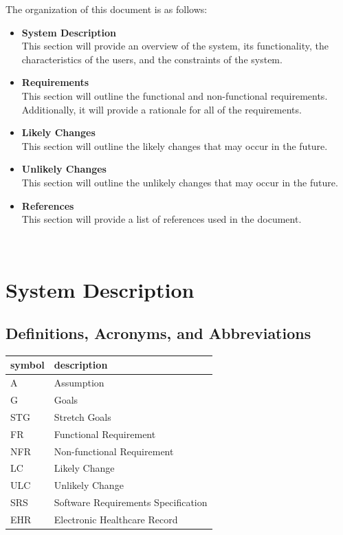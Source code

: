 \documentclass[12pt]{article}
\begin{document}
The organization of this document is as follows:
\begin{itemize}
  \item \textbf{System Description}\\
  This section will provide an overview of the system, its functionality, the characteristics of the users, and the constraints of the system.
  \item \textbf{Requirements}\\
  This section will outline the functional and non-functional requirements. Additionally, it will provide a rationale for all of the requirements.
  \item \textbf{Likely Changes}\\
  This section will outline the likely changes that may occur in the future.
  \item \textbf{Unlikely Changes}\\
  This section will outline the unlikely changes that may occur in the future.
  \item \textbf{References}\\
  This section will provide a list of references used in the document.

\end{itemize}

~\newpage

\section{System Description} \label{sec_SystemDescription}

\subsection{Definitions, Acronyms, and Abbreviations} \label{sec_DefinitionsAcronymsAbbreviations}

\begin{tabular}{l l} 
  \toprule    
  \textbf{symbol} & \textbf{description}\\
  \midrule 
  A & Assumption\\
  G & Goals\\
  STG & Stretch Goals\\
  FR & Functional Requirement\\
  NFR & Non-functional Requirement\\
  LC & Likely Change\\
  ULC & Unlikely Change\\
  SRS & Software Requirements Specification\\
  EHR & Electronic Healthcare Record\\
  
  \bottomrule
\end{tabular}\\
\end{document}
